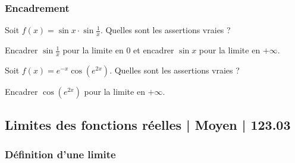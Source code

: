 \subsubsection{Encadrement}

\begin{question} 
Soit $f(x)= \sin x \cdot  \sin\frac{1}{x}$. Quelles sont les assertions vraies ?
\begin{answers}
    


\end{answers}
\begin{explanations}
 Encadrer $\sin\frac{1}{x}$ pour la limite en $0$   et encadrer $\sin x$ pour la limite en $+\infty$.
\end{explanations}

\end{question}


\begin{question} 
Soit $f(x)= e^{-x}\cos(e^{2x})$. Quelles sont les assertions vraies ?
\begin{answers}
    
        
    
\end{answers}
\begin{explanations}
 Encadrer $\cos(e^{2x})$ pour la limite en $+\infty$.
\end{explanations}

\end{question}


\subsection{Limites des fonctions réelles | Moyen | 123.03}

\subsubsection{Définition d'une limite}

